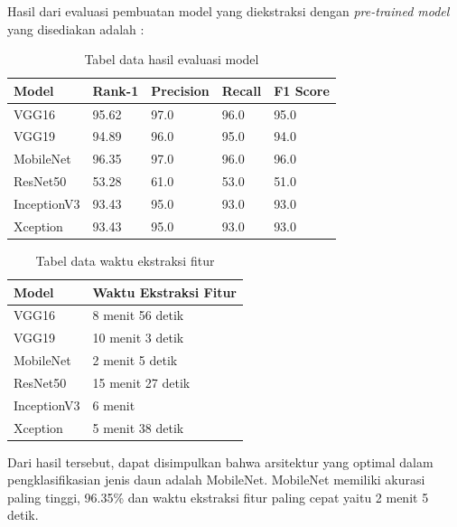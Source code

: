 \par Hasil dari evaluasi pembuatan model yang diekstraksi dengan \textit{pre-trained model} yang disediakan adalah :


\begin{table}[ht]
	\centering
	\begin{tabularx}{1.0\textwidth}
		{|p{2cm}|X|X|X|X|}
	\hline
	\rowcolor{lightgray} \centering Model&Rank-1&Precision&Recall&F1 Score \\ \hline
	\centering VGG16	& 	95.62 & 	97.0	& 96.0	&	95.0 \\ \hline
	\centering VGG19	& 94.89 &	96.0	&95.0	& 94.0 \\ \hline
    \rowcolor{green} \centering MobileNet	&	96.35	& 97.0	& 96.0 &	96.0 \\ \hline
	\centering ResNet50	& 53.28	& 61.0	& 53.0	& 51.0 \\ \hline
	\centering InceptionV3	&	93.43	&  95.0 & 93.0 & 93.0 \\ \hline
	\centering Xception	&	93.43	& 95.0 & 93.0 & 93.0 \\ \hline
	\end{tabularx}
	\caption{Tabel data hasil evaluasi model}
	\label{table:hasil}
\end{table}

\begin{table}[ht]
	\centering
	\begin{tabularx}{1.0\textwidth}
		{|X|X|}
		\hline
		\rowcolor{lightgray} \centering Model& Waktu Ekstraksi Fitur \\ \hline
		\centering VGG16	& 	8 menit 56 detik \\ \hline
		\centering VGG19	& 10 menit 3 detik \\ \hline
		\rowcolor{green} \centering MobileNet	&	2 menit 5 detik \\ \hline
		\centering ResNet50	& 15 menit 27 detik	\\ \hline
		\centering InceptionV3	&	6 menit \\ \hline
		\centering Xception	&	5 menit 38 detik \\ \hline
	\end{tabularx}
	\caption{Tabel data waktu ekstraksi fitur}
	\label{table:hasil}
\end{table}

Dari hasil tersebut, dapat disimpulkan bahwa arsitektur yang optimal dalam pengklasifikasian jenis daun adalah MobileNet. MobileNet memiliki akurasi paling tinggi, 96.35\% dan waktu ekstraksi fitur paling cepat yaitu 2 menit 5 detik.

